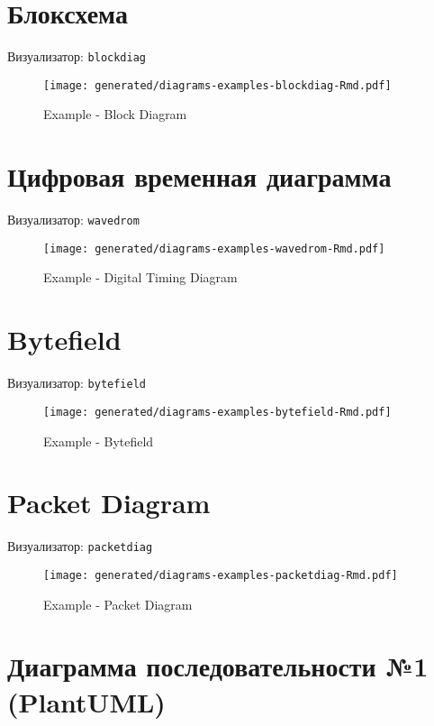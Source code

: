 \documentclass[12pt,a4paper,12pt,oneside,openany]{book}
\begin{document}
\newpage

\section{Блоксхема}

Визуализатор: \texttt{blockdiag}

\begin{figure}
\centering
\texttt{[image: generated/diagrams-examples-blockdiag-Rmd.pdf]}
\caption{Example - Block Diagram}
\end{figure}

\newpage

\section{Цифровая временная диаграмма}\label{--}

Визуализатор: \texttt{wavedrom}

\begin{figure}
\centering
\texttt{[image: generated/diagrams-examples-wavedrom-Rmd.pdf]}
\caption{Example - Digital Timing Diagram}
\end{figure}

\newpage

\section{Bytefield}\label{bytefield}

Визуализатор: \texttt{bytefield}

\begin{figure}
\centering
\texttt{[image: generated/diagrams-examples-bytefield-Rmd.pdf]}
\caption{Example - Bytefield}
\end{figure}

\newpage

\section{Packet Diagram}\label{packet-diagram}

Визуализатор: \texttt{packetdiag}

\begin{figure}
\centering
\texttt{[image: generated/diagrams-examples-packetdiag-Rmd.pdf]}
\caption{Example - Packet Diagram}
\end{figure}

\newpage

\section{Диаграмма последовательности №1 (PlantUML)}\label{--1-plantuml}
\end{document}
